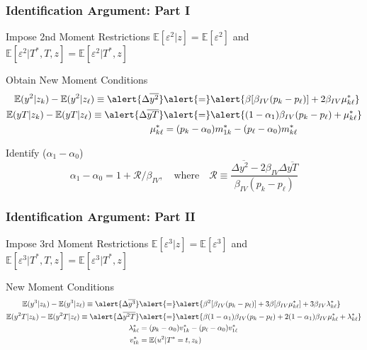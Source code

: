 \documentclass{beamer}
\begin{document}
\begin{frame}
  \frametitle{Identification Argument: Part I} 
  \begin{block}{Impose 2nd Moment Restrictions}
    $\mathbb{E}[\varepsilon^2|z]=\mathbb{E}[\varepsilon^2]$ and $\mathbb{E}[\varepsilon^2|T^*,T,z] = \mathbb{E}[\varepsilon^2|T^*,z]$
  \end{block}
  \begin{block}{Obtain New Moment Conditions}
    \vspace{-1em}
  \begin{align*}
    \mathbb{E}(y^2|z_k) - \mathbb{E}(y^2|z_\ell) \equiv \alert{\Delta\overline{y^2}} &\alert{=}  \alert{\beta [\beta_{IV} (p_k - p_\ell)]  + 2 \beta_{IV} \mu_{k\ell}^*}\\
    \mathbb{E}(yT|z_k) - \mathbb{E}(yT|z_\ell) \equiv \alert{ \Delta\overline{yT}} &\alert{=} \alert{(1-\alpha_1)\beta_{IV}(p_k - p_\ell) + \mu_{k\ell}^*}\\
    \mu_{k\ell}^* &=  (p_k - \alpha_0) m_{1k}^* - (p_{\ell}-\alpha_0)m_{k\ell}^*
  \end{align*}
  \end{block}
  \begin{alertblock}{Identify ($\alpha_1 - \alpha_0$)}
    \vspace{-1em}
    \[\alpha_1 - \alpha_0 = 1 + \mathcal{R}/\beta_{IV}, \quad \mbox{where} \quad
    \mathcal{R} \equiv \frac{\Delta\overline{y^2} - 2\beta_{IV}\Delta\overline{yT}}{\beta_{IV}(p_k - p_\ell)}\]
  \end{alertblock}
\end{frame}
\begin{frame}
  \frametitle{Identification Argument: Part II} 
  \begin{block}{Impose 3rd Moment Restrictions}
    $\mathbb{E}[\varepsilon^3|z]=\mathbb{E}[\varepsilon^3]$ and $\mathbb{E}[\varepsilon^3|T^*,T,z] = \mathbb{E}[\varepsilon^3|T^*,z]$
  \end{block}
  \begin{alertblock}{New Moment Conditions}
    \vspace{-1em}
    \footnotesize
  \begin{align*}
    \mathbb{E}(y^3|z_k) - \mathbb{E}(y^3|z_\ell)  \equiv  \alert{\Delta\overline{y^3}} &\alert{=} \alert{\beta^2 [\beta_{IV} (p_k - p_\ell)]  + 3 \beta [\beta_{IV} \mu_{k\ell}^*] + 3 \beta_{IV} \lambda^*_{k\ell}}\\
    \mathbb{E}(y^2T|z_k) - \mathbb{E}(y^2T|z_\ell) \equiv  \alert{\Delta\overline{y^2T}} &\alert{=}  \alert{\beta(1-\alpha_1)\beta_{IV}(p_k - p_\ell) + 2(1-\alpha_1)\beta_{IV}\mu_{k\ell}^* + \lambda_{k\ell}^*}\\
    \lambda_{k\ell}^* &= (p_k - \alpha_0) v_{1k}^* - (p_\ell - \alpha_0) v_{1\ell}^*\\
  v^*_{tk} &= \mathbb{E}(u^2|T^*=t, z_k)
  \end{align*}
  \end{alertblock}
\normalsize
\end{frame}
\end{document}
